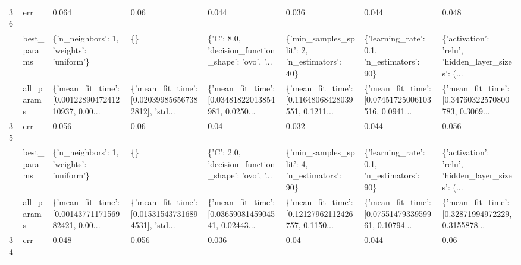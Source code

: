 \begin{tabular}{llllllll}
36 & err &                                              0.064 &                                               0.06 &                                              0.044 &                                              0.036 &                                              0.044 &                                              0.048 \\
   & best\_params &           \{'n\_neighbors': 1, 'weights': 'uniform'\} &                                                 \{\} &  \{'C': 8.0, 'decision\_function\_shape': 'ovo', '... &       \{'min\_samples\_split': 2, 'n\_estimators': 40\} &         \{'learning\_rate': 0.1, 'n\_estimators': 90\} &  \{'activation': 'relu', 'hidden\_layer\_sizes': (... \\
   & all\_params &  \{'mean\_fit\_time': [0.0012289047241210937, 0.00... &  \{'mean\_fit\_time': [0.020399856567382812], 'std... &  \{'mean\_fit\_time': [0.03481822013854981, 0.0250... &  \{'mean\_fit\_time': [0.11648068428039551, 0.1211... &  \{'mean\_fit\_time': [0.07451725006103516, 0.0941... &  \{'mean\_fit\_time': [0.34760322570800783, 0.3069... \\
35 & err &                                              0.056 &                                               0.06 &                                               0.04 &                                              0.032 &                                              0.044 &                                              0.056 \\
   & best\_params &           \{'n\_neighbors': 1, 'weights': 'uniform'\} &                                                 \{\} &  \{'C': 2.0, 'decision\_function\_shape': 'ovo', '... &       \{'min\_samples\_split': 4, 'n\_estimators': 90\} &         \{'learning\_rate': 0.1, 'n\_estimators': 90\} &  \{'activation': 'relu', 'hidden\_layer\_sizes': (... \\
   & all\_params &  \{'mean\_fit\_time': [0.0014377117156982421, 0.00... &  \{'mean\_fit\_time': [0.015315437316894531], 'std... &  \{'mean\_fit\_time': [0.0365908145904541, 0.02443... &  \{'mean\_fit\_time': [0.12127962112426757, 0.1150... &  \{'mean\_fit\_time': [0.0755147933959961, 0.10794... &  \{'mean\_fit\_time': [0.32871994972229, 0.3155878... \\
34 & err &                                              0.048 &                                              0.056 &                                              0.036 &                                               0.04 &                                              0.044 &                                               0.06 \\

\end{tabular}
